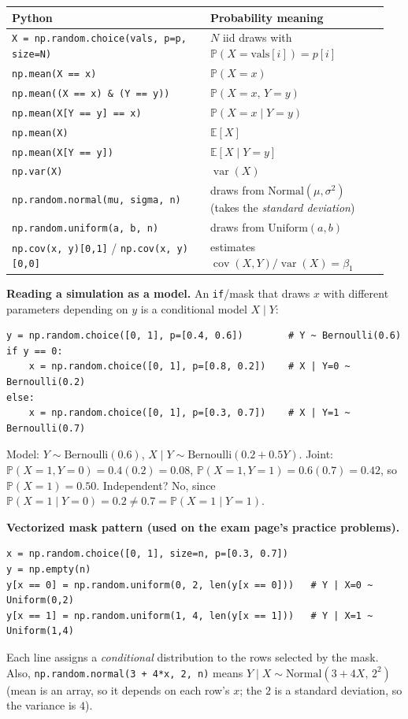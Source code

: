 \documentclass[11pt]{article}
\newcommand{\E}{\mathbb{E}}
\newcommand{\Var}{\operatorname{var}}
\newcommand{\Cov}{\operatorname{cov}}
\renewcommand{\P}{\mathbb{P}}
\newcommand{\given}{\mid}
\newcommand{\Bern}{\text{Bernoulli}}
\newcommand{\Unif}{\text{Uniform}}
\newcommand{\Norm}{\text{Normal}}
\newcommand{\py}[1]{\texttt{#1}}
\begin{document}
\begin{center}
\renewcommand{\arraystretch}{1.25}
\begin{tabular}{@{}p{0.5\linewidth}p{0.45\linewidth}@{}}
\toprule
Python & Probability meaning\\
\midrule
\py{X = np.random.choice(vals, p=p, size=N)} & $N$ iid draws with $\P(X=\text{vals}[i])=p[i]$\\
\py{np.mean(X == x)} & $\P(X=x)$\\
\py{np.mean((X == x) \& (Y == y))} & $\P(X=x,\,Y=y)$\\
\py{np.mean(X[Y == y] == x)} & $\P(X=x\given Y=y)$\\
\py{np.mean(X)} & $\E[X]$\\
\py{np.mean(X[Y == y])} & $\E[X\given Y=y]$\\
\py{np.var(X)} & $\Var(X)$\\
\py{np.random.normal(mu, sigma, n)} & draws from $\Norm(\mu,\sigma^2)$ (takes the \emph{standard deviation})\\
\py{np.random.uniform(a, b, n)} & draws from $\Unif(a,b)$\\
\py{np.cov(x, y)[0,1]} / \py{np.cov(x, y)[0,0]} & estimates $\Cov(X,Y)/\Var(X)=\beta_1$\\
\bottomrule
\end{tabular}
\end{center}

\textbf{Reading a simulation as a model.} An \py{if}/mask that draws $x$ with different parameters depending on $y$ is a conditional model $X\given Y$:
\begin{lstlisting}
y = np.random.choice([0, 1], p=[0.4, 0.6])        # Y ~ Bernoulli(0.6)
if y == 0:
    x = np.random.choice([0, 1], p=[0.8, 0.2])    # X | Y=0 ~ Bernoulli(0.2)
else:
    x = np.random.choice([0, 1], p=[0.3, 0.7])    # X | Y=1 ~ Bernoulli(0.7)
\end{lstlisting}
Model: $Y\sim\Bern(0.6)$, $X\given Y\sim\Bern(0.2+0.5Y)$. Joint: $\P(X{=}1,Y{=}0)=0.4(0.2)=0.08$, $\P(X{=}1,Y{=}1)=0.6(0.7)=0.42$,
so $\P(X{=}1)=0.50$. Independent? No, since $\P(X{=}1\given Y{=}0)=0.2\ne0.7=\P(X{=}1\given Y{=}1)$.

\textbf{Vectorized mask pattern (used on the exam page's practice problems).}
\begin{lstlisting}
x = np.random.choice([0, 1], size=n, p=[0.3, 0.7])
y = np.empty(n)
y[x == 0] = np.random.uniform(0, 2, len(y[x == 0]))   # Y | X=0 ~ Uniform(0,2)
y[x == 1] = np.random.uniform(1, 4, len(y[x == 1]))   # Y | X=1 ~ Uniform(1,4)
\end{lstlisting}
Each line assigns a \emph{conditional} distribution to the rows selected by the mask. Also, \py{np.random.normal(3 + 4*x, 2, n)} means
$Y\given X\sim\Norm(3+4X,\,2^2)$ (mean is an array, so it depends on each row's $x$; the $2$ is a standard deviation, so the variance is $4$).
\end{document}
